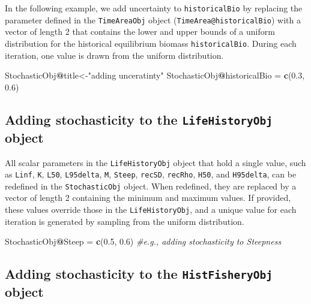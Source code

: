 \documentclass[
]{book}
\newenvironment{Shaded}{\begin{snugshade}}{\end{snugshade}}
\newcommand{\CommentTok}[1]{\textcolor[rgb]{0.56,0.35,0.01}{\textit{#1}}}
\newcommand{\FloatTok}[1]{\textcolor[rgb]{0.00,0.00,0.81}{#1}}
\newcommand{\FunctionTok}[1]{\textcolor[rgb]{0.13,0.29,0.53}{\textbf{#1}}}
\newcommand{\NormalTok}[1]{#1}
\newcommand{\OtherTok}[1]{\textcolor[rgb]{0.56,0.35,0.01}{#1}}
\newcommand{\SpecialCharTok}[1]{\textcolor[rgb]{0.81,0.36,0.00}{\textbf{#1}}}
\newcommand{\StringTok}[1]{\textcolor[rgb]{0.31,0.60,0.02}{#1}}
\begin{document}
In the following example, we add uncertainty to \texttt{historicalBio} by replacing the parameter defined in the \texttt{TimeAreaObj} object (\texttt{TimeArea@historicalBio}) with a vector of length 2 that contains the lower and upper bounds of a uniform distribution for the historical equilibrium biomass \texttt{historicalBio}. During each iteration, one value is drawn from the uniform distribution.

\begin{Shaded}
\begin{Highlighting}[]
\NormalTok{StochasticObj}\SpecialCharTok{@}\NormalTok{title}\OtherTok{\textless{}{-}}\StringTok{"adding unceratinty"}
\NormalTok{StochasticObj}\SpecialCharTok{@}\NormalTok{historicalBio }\OtherTok{=} \FunctionTok{c}\NormalTok{(}\FloatTok{0.3}\NormalTok{, }\FloatTok{0.6}\NormalTok{)}
\end{Highlighting}
\end{Shaded}

\subsection{\texorpdfstring{Adding stochasticity to the \texttt{LifeHistoryObj} object}{Adding stochasticity to the LifeHistoryObj object}}\label{adding-stochasticity-to-the-lifehistoryobj-object}

All scalar parameters in the \texttt{LifeHistoryObj} object that hold a single value, such as \texttt{Linf}, \texttt{K}, \texttt{L50}, \texttt{L95delta}, \texttt{M}, \texttt{Steep}, \texttt{recSD}, \texttt{recRho}, \texttt{H50}, and \texttt{H95delta}, can be redefined in the \texttt{StochasticObj} object. When redefined, they are replaced by a vector of length 2 containing the minimum and maximum values. If provided, these values override those in the \texttt{LifeHistoryObj}, and a unique value for each iteration is generated by sampling from the uniform distribution.

\begin{Shaded}
\begin{Highlighting}[]
\NormalTok{StochasticObj}\SpecialCharTok{@}\NormalTok{Steep }\OtherTok{=} \FunctionTok{c}\NormalTok{(}\FloatTok{0.5}\NormalTok{, }\FloatTok{0.6}\NormalTok{) }\CommentTok{\#e.g., adding stochasticity to Steepness}
\end{Highlighting}
\end{Shaded}

\subsection{\texorpdfstring{Adding stochasticity to the \texttt{HistFisheryObj} object}{Adding stochasticity to the HistFisheryObj object}}\label{adding-stochasticity-to-the-histfisheryobj-object}
\end{document}
